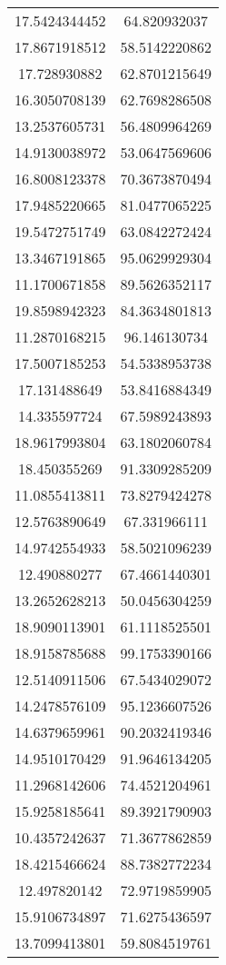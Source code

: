 \begin{table}
\begin{tabular}{cc}
17.5424344452 & 64.820932037 \\
17.8671918512 & 58.5142220862 \\
17.728930882 & 62.8701215649 \\
16.3050708139 & 62.7698286508 \\
13.2537605731 & 56.4809964269 \\
14.9130038972 & 53.0647569606 \\
16.8008123378 & 70.3673870494 \\
17.9485220665 & 81.0477065225 \\
19.5472751749 & 63.0842272424 \\
13.3467191865 & 95.0629929304 \\
11.1700671858 & 89.5626352117 \\
19.8598942323 & 84.3634801813 \\
11.2870168215 & 96.146130734 \\
17.5007185253 & 54.5338953738 \\
17.131488649 & 53.8416884349 \\
14.335597724 & 67.5989243893 \\
18.9617993804 & 63.1802060784 \\
18.450355269 & 91.3309285209 \\
11.0855413811 & 73.8279424278 \\
12.5763890649 & 67.331966111 \\
14.9742554933 & 58.5021096239 \\
12.490880277 & 67.4661440301 \\
13.2652628213 & 50.0456304259 \\
18.9090113901 & 61.1118525501 \\
18.9158785688 & 99.1753390166 \\
12.5140911506 & 67.5434029072 \\
14.2478576109 & 95.1236607526 \\
14.6379659961 & 90.2032419346 \\
14.9510170429 & 91.9646134205 \\
11.2968142606 & 74.4521204961 \\
15.9258185641 & 89.3921790903 \\
10.4357242637 & 71.3677862859 \\
18.4215466624 & 88.7382772234 \\
12.497820142 & 72.9719859905 \\
15.9106734897 & 71.6275436597 \\
13.7099413801 & 59.8084519761 \\

\end{tabular}
\end{table}
